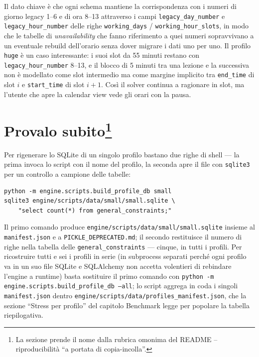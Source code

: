 Il dato chiave \`e che ogni schema mantiene la corrispondenza con
i numeri di giorno legacy 1--6 e di ora 8--13 attraverso i campi
\texttt{legacy\_day\_number} e \texttt{legacy\_hour\_number} delle
righe \texttt{working\_days} / \texttt{working\_hour\_slots}, in
modo che le tabelle di \emph{unavailability} che fanno riferimento
a quei numeri sopravvivano a un eventuale rebuild dell'orario senza
dover migrare i dati uno per uno. Il profilo \texttt{huge} \`e
un caso interessante: i suoi slot da 55 minuti restano con
\texttt{legacy\_hour\_number} 8--13, e il blocco di 5 minuti tra
una lezione e la successiva non \`e modellato come slot intermedio
ma come margine implicito tra \texttt{end\_time} di slot $i$ e
\texttt{start\_time} di slot $i+1$. Cos\`i il solver continua a
ragionare in slot, ma l'utente che apre la calendar view vede
gli orari con la pausa.

\section[Provalo subito]{Provalo subito\protect\footnote{La sezione
prende il nome dalla rubrica omonima del README -- riproducibilit\`a
``a portata di copia-incolla''.}}

Per rigenerare lo SQLite di un singolo profilo bastano due
righe di shell --- la prima invoca lo script con il nome del
profilo, la seconda apre il file con \texttt{sqlite3} per un
controllo a campione delle tabelle:

\begin{lstlisting}[style=shell]
python -m engine.scripts.build_profile_db small
sqlite3 engine/scripts/data/small/small.sqlite \
    "select count(*) from general_constraints;"
\end{lstlisting}

\noindent Il primo comando produce
\texttt{engine/scripts/data/small/small.sqlite} insieme al
\texttt{manifest.json} e a \texttt{PICKLE\_DEPRECATED.md}; il
secondo restituisce il numero di righe nella tabella delle
\texttt{general\_constraints} --- cinque, in tutti i profili. Per
ricostruire tutti e sei i profili in serie (in subprocess separati
perch\'e ogni profilo va in un suo file SQLite e SQLAlchemy non
accetta volentieri di rebindare l'engine a runtime) basta sostituire
il primo comando con \texttt{python -m engine.scripts.build\_profile\_db --all};
lo script aggrega in coda i singoli \texttt{manifest.json} dentro
\texttt{engine/scripts/data/profiles\_manifest.json}, che la sezione
``Stress per profilo'' del capitolo Benchmark legge per popolare
la tabella riepilogativa.

